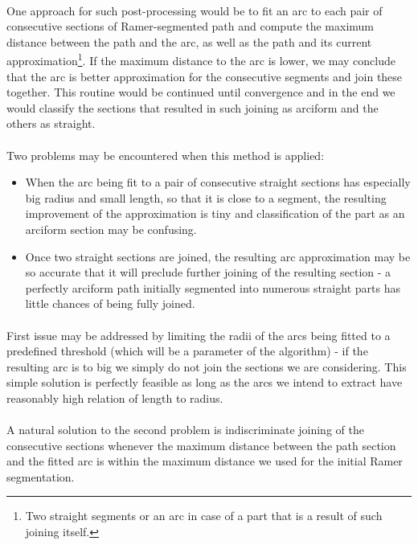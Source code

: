 \paragraph*{}
One approach for such post-processing would be to fit an arc to each pair of consecutive sections of Ramer-segmented path and compute the maximum distance between the path and the arc, as well as the path and its current approximation\footnote{Two straight segments or an arc in case of a part that is a result of such joining itself.}. If the maximum distance to the arc is lower, we may conclude that the arc is better approximation for the consecutive segments and join these together. This routine would be continued until convergence and in the end we would classify the sections that resulted in such joining as arciform and the others as straight.

\paragraph*{}
Two problems may be encountered when this method is applied:

\begin{itemize}
	\item When the arc being fit to a pair of consecutive straight sections has especially big radius and small length, so that it is close to a segment, the resulting improvement of the approximation is tiny and classification of the part as an arciform section may be confusing.
	\item Once two straight sections are joined, the resulting arc approximation may be so accurate that it will preclude further joining of the resulting section - a perfectly arciform path initially segmented into numerous straight parts has little chances of being fully joined.
\end{itemize}

\paragraph*{}
First issue may be addressed by limiting the radii of the arcs being fitted to a predefined threshold (which will be a parameter of the algorithm) - if the resulting arc is to big we simply do not join the sections we are considering. This simple solution is perfectly feasible as long as the arcs we intend to extract have reasonably high relation of length to radius.

\paragraph*{}
A natural solution to the second problem is indiscriminate joining of the consecutive sections whenever the maximum distance between the path section and the fitted arc is within the maximum distance we used for the initial Ramer segmentation.

